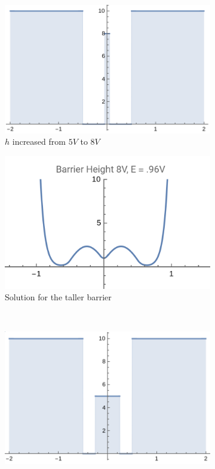\documentclass{article}
\numberwithin{equation}{section}
\begin{document}
\begin{figure}[htp]
    \centering
    \begin{subfigure}[b]{0.45\textwidth}
        \includegraphics[width=\textwidth]{III3_taller.png}
        \caption{$h$ increased from $5V$ to $8V$}
        \label{fig:fig1}
    \end{subfigure}
    \hfill
    \begin{subfigure}[b]{0.45\textwidth}
        \includegraphics[width=\textwidth]{III3_tallerSol.png}
        \caption{Solution for the taller barrier}
        \label{fig:fig2}
    \end{subfigure}
    \
    \begin{subfigure}[b]{0.45\textwidth}
        \includegraphics[width=\textwidth]{III3_wider.png}

\end{subfigure}
\end{figure}
\end{document}
